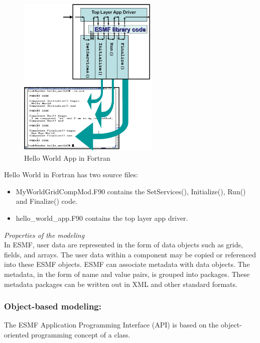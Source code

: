 \begin{figure}[htbp]
\centering
\includegraphics[width=0.6\textwidth]{pics/esmf/Figure4.png}
\caption{Hello World App in Fortran}
\label{fig:Hello World App in Fortran}
\end{figure}

Hello World in Fortran has two source files:\\
\begin{itemize}
	\item MyWorldGridCompMod.F90 contains the SetServices(), Initialize(), Run() and Finalize() code.
	\item hello\_world\_app.F90 contains the top layer app driver.
\end{itemize}


\emph{Properties of the modeling}\\
In ESMF, user data are represented in the form of data objects such as grids, fields, and arrays. The user data within a component may be copied or referenced into these ESMF objects. ESMF can associate metadata with data objects. The metadata, in the form of name and value pairs, is grouped into packages. These metadata packages can be written out in XML and other standard formats.\\

\subsubsection{Object-based modeling:}
The ESMF Application Programming Interface (API) is based on the object-oriented programming concept of a class.
